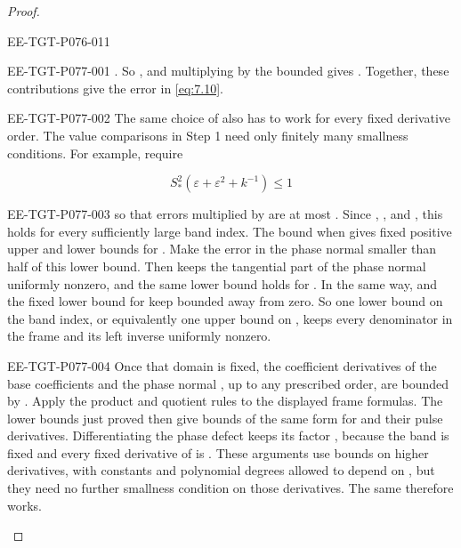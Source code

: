 \begin{proof}
\begin{EESegment}{EE-TGT-P076-011}
\end{EESegment}
\begin{EESegment}{EE-TGT-P077-001}
. So , and multiplying by the bounded  gives . Together, these contributions give the error  in \eqref{eq:7.10}.
\end{EESegment}

\begin{EESegment}{EE-TGT-P077-002}
The same choice of  also has to work for every fixed derivative order. The value comparisons in Step 1 need only finitely many smallness conditions. For example, require
\end{EESegment}
\[
S_*^2(\varepsilon+\varepsilon^2+k^{-1})\leq1
\]
\begin{EESegment}{EE-TGT-P077-003}
so that errors multiplied by  are at most . Since , , and , this holds for every sufficiently large band index. The bound  when  gives fixed positive upper and lower bounds for . Make the error in the phase normal smaller than half of this lower bound. Then  keeps the tangential part of the phase normal uniformly nonzero, and the same lower bound holds for . In the same way,  and the fixed lower bound for  keep  bounded away from zero. So one lower bound on the band index, or equivalently one upper bound  on , keeps every denominator in the frame and its left inverse uniformly nonzero.
\end{EESegment}

\begin{EESegment}{EE-TGT-P077-004}
Once that domain is fixed, the coefficient derivatives of the base coefficients and the phase normal , up to any prescribed order, are bounded by . Apply the product and quotient rules to the displayed frame formulas. The lower bounds just proved then give bounds of the same form for  and their pulse derivatives. Differentiating the phase defect keeps its factor , because the band is fixed and every fixed derivative of  is . These arguments use bounds on higher derivatives, with constants and polynomial degrees allowed to depend on , but they need no further smallness condition on those derivatives. The same  therefore works.
\end{EESegment}
\end{proof}

